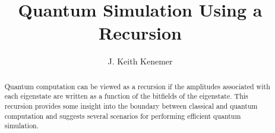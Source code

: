 \documentclass[reqno]{amsart}
\theoremstyle{definition}
\theoremstyle{remark}
\begin{document}

\title{Quantum Simulation Using a Recursion}

\author{J. Keith Kenemer}






\begin{abstract}
Quantum computation can be viewed as a recursion if the amplitudes associated with each 
eigenstate are written as a function of the bitfields of the eigenstate.  This recursion
provides some insight into the boundary between classical and quantum computation and suggests 
several scenarios for performing efficient quantum simulation.
\end{abstract}


 \maketitle



\end{document}
